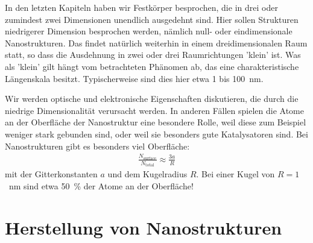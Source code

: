 In den letzten Kapiteln haben wir Festkörper besprochen, die in drei oder zumindest zwei Dimensionen unendlich ausgedehnt sind. Hier sollen Strukturen niedrigerer Dimension besprochen werden, nämlich null- oder eindimensionale Nanostrukturen. Das findet natürlich weiterhin in einem dreidimensionalen Raum statt, so dass die Ausdehnung in zwei oder drei Raumrichtungen 'klein' ist. Was als 'klein' gilt hängt vom betrachteten Phänomen ab, das eine charakteristische  Längenskala besitzt. Typischerweise sind dies hier etwa 1 bis 100~nm.

Wir werden optische und elektronische Eigenschaften diskutieren, die durch die niedrige Dimensionalität verursacht werden. In anderen Fällen spielen die Atome an der Oberfläche der Nanostruktur eine besondere Rolle, weil diese zum Beispiel weniger stark gebunden sind, oder weil sie besonders gute Katalysatoren sind. Bei Nanostrukturen gibt es besonders viel Oberfläche:
\begin{eqnarray}
    \frac{N_\text{surface}}{N_\text{total}} \approx \frac{3 a}{R}
\end{eqnarray}
mit der Gitterkonstanten  $a$ und dem Kugelradius $R$. Bei einer Kugel von $R=1$~nm sind etwa 50~\% der Atome an der Oberfläche!







\section*{Herstellung von Nanostrukturen}

